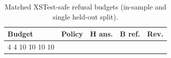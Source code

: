 \begin{table}[t]
\centering
\footnotesize
\setlength{\tabcolsep}{3pt}
\caption{Matched XSTest-safe refusal budgets (in-sample and single held-out split).}
\label{tab:matched}
\begin{tabular}{@{}lrrrr@{}}
\toprule
Budget & Policy & H ans. & B ref. & Rev. \\
\midrule
4%
4%
10%
10%
10%
10%
\bottomrule
\end{tabular}
\end{table}
